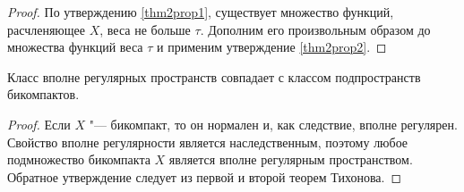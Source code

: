 \begin{proof}
    По утверждению \ref{thm2prop1}, существует множество функций, расчленяющее $X$, веса не больше $\tau$. Дополним его произвольным образом до множества функций веса $\tau$ и применим утверждение \ref{thm2prop2}.
\end{proof}

\begin{corollary}
    Класс вполне регулярных пространств совпадает с классом подпространств бикомпактов.
\end{corollary}

\begin{proof}
    Если $X$ "--- бикомпакт, то он нормален и, как следствие, вполне регулярен. Свойство вполне регулярности является наследственным, поэтому любое подмножество бикомпакта $X$ является вполне регулярным пространством. Обратное утверждение следует из первой и второй теорем Тихонова.
\end{proof}
